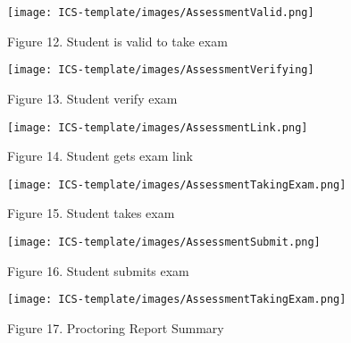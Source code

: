 \documentclass{icsthesis}
\begin{document}
\begin{mainmatter}
\begin{figure}[h]
    \centering
    \texttt{[image: ICS-template/images/AssessmentValid.png]}
    \newline
    \captionsetup{labelformat=empty}
    \caption{Figure 12. Student is valid to take exam}
    \label{Figure 12: Student is valid to take exam}
\end{figure}

\begin{figure}[h]
    \centering
    \texttt{[image: ICS-template/images/AssessmentVerifying]}
    \newline
    \captionsetup{labelformat=empty}
    \caption{Figure 13. Student verify exam}
    \label{Figure 13: Student verify exam}
\end{figure}

\begin{figure}[h]
    \centering
    \texttt{[image: ICS-template/images/AssessmentLink.png]}
    \newline
    \captionsetup{labelformat=empty}
    \caption{Figure 14. Student gets exam link}
    \label{Figure 14: Student gets exam link}
\end{figure}

\begin{figure}[h]
    \centering
    \texttt{[image: ICS-template/images/AssessmentTakingExam.png]}
    \newline
    \captionsetup{labelformat=empty}
    \caption{Figure 15. Student takes exam}
    \label{Figure 15: Student takes exam}
\end{figure}

\begin{figure}[h]
    \centering
    \texttt{[image: ICS-template/images/AssessmentSubmit.png]}
    \newline
    \captionsetup{labelformat=empty}
    \caption{Figure 16. Student submits exam}
    \label{Figure 16: Student submits exam}
\end{figure}

\begin{figure}[h]
    \centering
    \texttt{[image: ICS-template/images/AssessmentTakingExam.png]}
    \newline
    \captionsetup{labelformat=empty}
    \caption{Figure 17. Proctoring Report Summary}
    \label{Figure 17: Proctoring Report Summary}
\end{figure}


\end{mainmatter}
\end{document}
